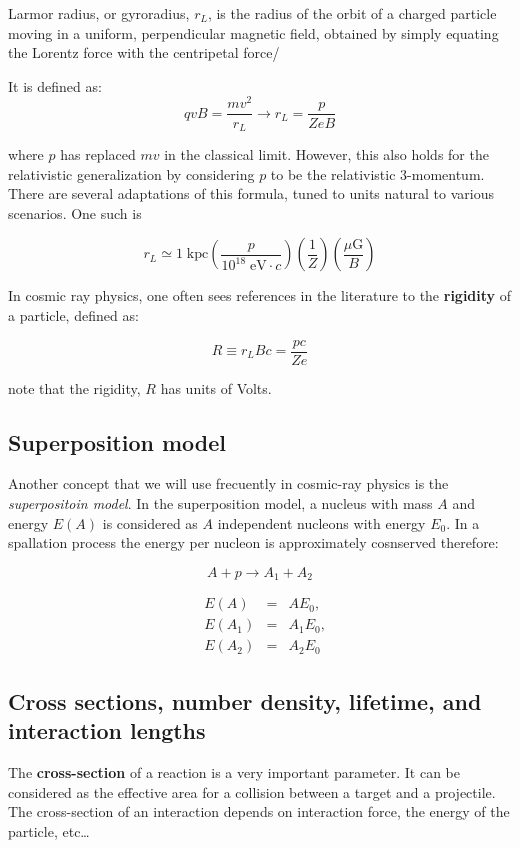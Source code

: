 \documentclass[
  letterpaper,
  DIV=11,
  numbers=noendperiod]{scrreprt}
\begin{document}
Larmor radius, or gyroradius, \(r_L\), is the radius of the orbit of a
charged particle moving in a uniform, perpendicular magnetic field,
obtained by simply equating the Lorentz force with the centripetal
force/

It is defined as:
\[q v B = \frac{mv^2}{r_L} \rightarrow r_L = \frac{p}{ZeB}\]

where \(p\) has replaced \(mv\) in the classical limit. However, this
also holds for the relativistic generalization by considering \(p\) to
be the relativistic 3-momentum. There are several adaptations of this
formula, tuned to units natural to various scenarios. One such is

\[r_L \simeq  1 \;\mathrm{ kpc} \left(\frac{p}{10^{18}\;\mathrm{ eV}\cdot{c}}\right)\left(\frac{1}{Z}\right)\left(\frac{\mu\mathrm{ G}}{B}\right)\]

In cosmic ray physics, one often sees references in the literature to
the \textbf{rigidity} of a particle, defined as:

\[
R \equiv r_L B c = \frac{pc}{Ze}
\]

note that the rigidity, \(R\) has units of Volts.

\subsection{Superposition model}\label{superposition-model}

Another concept that we will use frecuently in cosmic-ray physics is the
\emph{superpositoin model}. In the superposition model, a nucleus with
mass \(A\) and energy \(E(A)\) is considered as \(A\) independent
nucleons with energy \(E_0\). In a spallation process the energy per
nucleon is approximately cosnserved therefore:

\[A + p \rightarrow A_1 + A_2\]

\[\begin{alignedat}{2}
&E(A) &= &A E_0,\\
&E(A_1) &= &A_1 E_0,\\
&E(A_2) &= &A_2 E_0
\end{alignedat}\]

\subsection{Cross sections, number density, lifetime, and interaction
lengths}\label{cross-sections-number-density-lifetime-and-interaction-lengths}

The \textbf{cross-section} of a reaction is a very important parameter.
It can be considered as the effective area for a collision between a
target and a projectile. The cross-section of an interaction depends on
interaction force, the energy of the particle, etc\ldots{}
\end{document}
